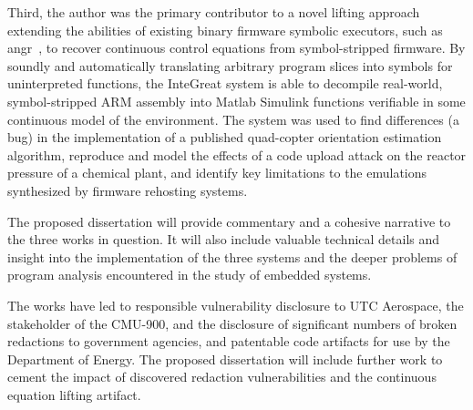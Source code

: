 \noindent
Third, the author was the primary contributor to a novel lifting approach extending the abilities of existing binary firmware symbolic executors, such as angr~\cite{wang2017angr}, to recover continuous control equations from symbol-stripped firmware.
By soundly and automatically translating arbitrary program slices into symbols for uninterpreted functions, the InteGreat system is able to decompile real-world, symbol-stripped ARM assembly into Matlab Simulink functions verifiable in some continuous model of the environment. 
The system was used to find differences (a bug) in the implementation of a published quad-copter orientation estimation algorithm, reproduce and model the effects of a code upload attack on the reactor pressure of a chemical plant, and identify key limitations to the emulations synthesized by firmware rehosting systems.


\noindent The proposed dissertation will provide commentary and a cohesive narrative to the three works in question. It will also include valuable technical details and insight into the implementation of the three systems and the deeper problems of program analysis encountered in the study of embedded systems.


\noindent The works have led to responsible vulnerability disclosure to UTC Aerospace, the stakeholder of the CMU-900, and the disclosure of significant numbers of broken redactions to government agencies, and patentable code artifacts for use by the Department of Energy. The proposed dissertation will include further work to cement the impact of discovered redaction vulnerabilities and the continuous equation lifting artifact.
